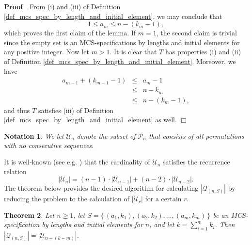 \documentclass{article}
\newtheorem{theorem}{Theorem}[section]
\newtheorem{notation}[theorem]{Notation}
\def\proof{\par \noindent              %
\mbox{\bf Proof}\ \,}                  %
\def\endproof{\mbox{$\Box$} \par }     %
\begin{document}
\proof
From (i) and (iii) of Definition \ref{def_mcs_spec_by_length_and_initial_element}, we may conclude that
$$1 \leq a_m \leq n - (k_m - 1),$$ which proves the first claim of the lemma.
If $m=1$, the second claim is trivial since the empty set is an MCS-specifications by lengths
and initial elements for any positive integer. Now let $m > 1$. It is clear that $T$ has properties
(i) and (ii) of Definition \ref{def_mcs_spec_by_length_and_initial_element}. Moreover, we have 
\begin{eqnarray*}
  a_{m-1} + (k_{m-1} - 1) & \leq & a_m - 1 \\
                          & \leq & n - k_m \\
                          & \leq & n - (k_m-1),
\end{eqnarray*} 
and thus $T$ satisfies (iii) of Definition \ref{def_mcs_spec_by_length_and_initial_element} as well.
\endproof

\begin{notation}
  We let ${\mathcal U}_n$ denote the subset of ${\mathcal P}_n$ that consists of all permutations with no consecutive
  sequences.
\end{notation}

It is well-known (see e.g. \cite{JedYang}) that the cardinality of ${\mathcal U}_n$ satisfies the recurrence relation
$$
|{\mathcal U}_n| = (n-1) \cdot |{\mathcal U}_{n-1}| + (n-2) \cdot |{\mathcal U}_{n-2}|.
$$
The theorem below provides the desired algorithm for calculating $|{\mathcal Q}_{(n,S)}|$ by reducing the
problem to the calculation of $|{\mathcal U}_r|$ for a certain $r$.
 
\begin{theorem}\label{theorem_count_by_length_and_initial_element}
  Let $n \geq 1$, let $S = \{\,(a_1, k_1), (a_2, k_2), \ldots,(a_m, k_m)\,\}$ be an
  MCS-specification by lengths and initial elements for $n$, and let $k = \sum_{i=1}^m k_i$.
  Then $|{\mathcal Q}_{(n,S)}| = |{\mathcal U}_{n - (k - m)}|$.
\end{theorem}
\end{document}
